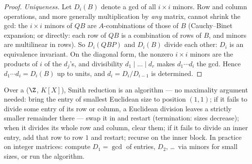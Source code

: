 \begin{proof}
\emph{Uniqueness.} Let $D_i(B)$ denote a gcd of all $i \times i$
minors. Row and column operations, and more generally
multiplication by \emph{any} matrix, cannot shrink the gcd: the
$i \times i$ minors of $QB$ are $A$-combinations of those of $B$
(Cauchy--Binet expansion; or directly: each row of $QB$ is a
combination of rows of $B$, and minors are multilinear in rows).
So $D_i(QBP)$ and $D_i(B)$ divide each other: $D_i$ is an
equivalence invariant. On the diagonal form, the nonzero $i
\times i$ minors are the products of $i$ of the $d_j$'s, and
divisibility $d_1 \mid \dots \mid d_r$ makes $d_1 \cdots d_i$ the
gcd. Hence $d_1 \cdots d_i = D_i(B)$ up to units, and $d_i =
D_i/D_{i-1}$ is determined.
\end{proof}

\begin{method}\label{met:b3:modules:smith}
Over a  ($\Z$, $K[X]$), Smith reduction is an
algorithm --- no maximality argument needed: bring the entry of
smallest Euclidean size to position $(1,1)$; if it fails to divide
some entry of its row or column, a Euclidean division leaves a
strictly smaller remainder there --- swap it in and restart
(termination: sizes decrease); when it divides its whole row and
column, clear them; if it fails to divide an inner entry, add that
row to row $1$ and restart; recurse on the inner block. In
practice on integer matrices: compute $D_1 = \gcd$ of entries,
$D_2$, \dots\ via minors for small sizes, or run the algorithm.
\end{method}

